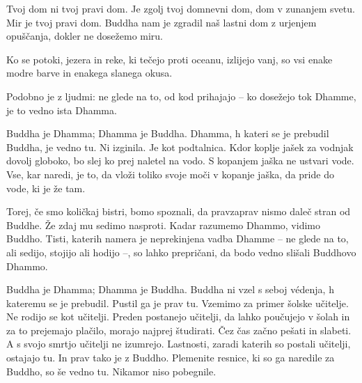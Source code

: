 
\cleartorecto
\thispagestyle{empty}

\vspace*{-\headsep}
\noindent%
\begin{minipage}[c][\textheight][c]{\linewidth}

\noindent%
\begin{minipage}{\linewidth}


Tvoj dom ni tvoj pravi dom. Je zgolj tvoj domnevni dom, dom v zunanjem svetu. Mir je tvoj pravi dom. Buddha nam je zgradil naš lastni dom z urjenjem opuščanja, dokler ne dosežemo miru.

\end{minipage}

\end{minipage}


\clearpage


Ko se potoki, jezera in reke, ki tečejo proti oceanu, izlijejo vanj, so vsi enake modre barve in enakega slanega okusa.

Podobno je z ljudmi: ne glede na to, od kod prihajajo – ko dosežejo tok Dhamme, je to vedno ista Dhamma.


Buddha je Dhamma; Dhamma je Buddha. Dhamma, h kateri se je prebudil Buddha, je vedno tu. Ni izginila. Je kot podtalnica. Kdor koplje jašek za vodnjak dovolj globoko, bo slej ko prej naletel na vodo. S kopanjem jaška ne ustvari vode. Vse, kar naredi, je to, da vloži toliko svoje moči v kopanje jaška, da pride do vode, ki je že tam.

Torej, če smo količkaj bistri, bomo spoznali, da pravzaprav nismo daleč stran od Buddhe. Že zdaj mu sedimo nasproti. Kadar razumemo Dhammo, vidimo Buddho. Tisti, katerih namera je neprekinjena vadba Dhamme – ne glede na to, ali sedijo, stojijo ali hodijo –, so lahko prepričani, da bodo vedno slišali Buddhovo Dhammo.

\clearpage


Buddha je Dhamma; Dhamma je Buddha. Buddha ni vzel s seboj védenja, h kateremu se je prebudil. Pustil ga je prav tu. Vzemimo za primer šolske učitelje. Ne rodijo se kot učitelji. Preden postanejo učitelji, da lahko poučujejo v šolah in za to prejemajo plačilo, morajo najprej študirati. Čez čas začno pešati in slabeti. A s svojo smrtjo učitelji ne izumrejo. Lastnosti, zaradi katerih so postali učitelji, ostajajo tu. In prav tako je z Buddho. Plemenite resnice, ki so ga naredile za Buddho, so še vedno tu. Nikamor niso pobegnile.

